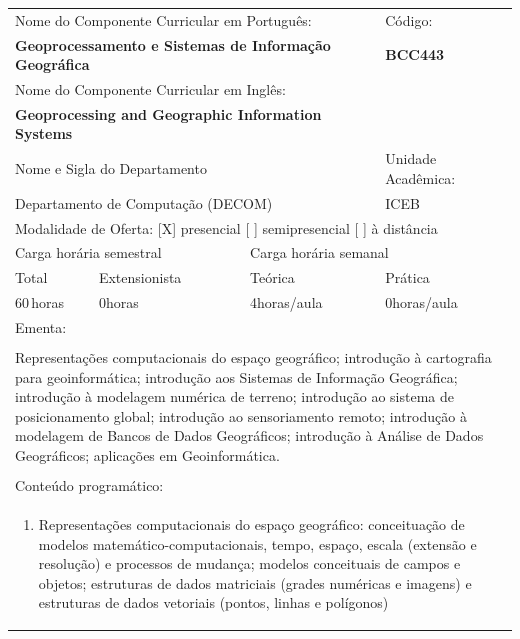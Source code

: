 \documentclass[11pt]{article}
\begin{document}
\begin{center}
\begin{longtable}{|p{4cm}|p{4cm}|p{4cm}|p{4cm}|}
\hline
\multicolumn{3}{|p{12cm}|}{Nome do Componente Curricular em Português:} &
\multicolumn{1}{p{4cm}|}{Código:} \\ 
\multicolumn{3}{|p{12cm}|}{\textbf{Geoprocessamento e Sistemas de Informação Geográfica}} &
\textbf{BCC443}\\ 
\multicolumn{3}{|p{12cm}|}{Nome do Componente Curricular em Inglês:} & \\ 
\multicolumn{3}{|p{12cm}|}{\textbf{Geoprocessing and Geographic Information Systems}} & \\ 
\hline
\multicolumn{3}{|p{12cm}|}{Nome e Sigla do Departamento} & Unidade Acadêmica: \\ 
\multicolumn{3}{|p{12cm}|}{Departamento de Computação (DECOM)} & {ICEB} \\ 
\hline
\multicolumn{4}{|p{16cm}|}{Modalidade de Oferta:
[X] presencial \hspace{0.6cm}
[ ] semipresencial \hspace{0.6cm}
[ ] à distância}\\
\hline
\multicolumn{2}{|p{8cm}|}{Carga horária semestral} &
\multicolumn{2}{p{8cm}|}{Carga horária semanal}\\
\hline
\multicolumn{1}{|p{4cm}|}{Total} &
\multicolumn{1}{p{4cm}|}{Extensionista} &
\multicolumn{1}{p{4cm}|}{Teórica} &
\multicolumn{1}{p{4cm}|}{Prática} \\ 
\multicolumn{1}{|p{4cm}|}{60\,horas} &
\multicolumn{1}{p{4cm}|}{0\;horas} &
\multicolumn{1}{p{4cm}|}{4\;horas/aula} &
\multicolumn{1}{p{4cm}|}{0\;horas/aula} \\ 
\hline
\multicolumn{4}{|p{16cm}|}{Ementa:}\\
\multicolumn{4}{|p{16cm}|}{}\\
\multicolumn{4}{|p{\dimexpr 16cm + 6\tabcolsep\relax}|}{Representações computacionais do espaço geográfico; introdução à cartografia para geoinformática; introdução aos Sistemas de Informação Geográfica; introdução à modelagem numérica de terreno; introdução ao sistema de posicionamento global; introdução ao sensoriamento remoto; introdução à modelagem de Bancos de Dados Geográficos; introdução à Análise de Dados Geográficos; aplicações em Geoinformática.}\\
\multicolumn{4}{|p{16cm}|}{}\\
\hline
\multicolumn{4}{|p{16cm}|}{Conteúdo programático:}\\*
\multicolumn{4}{|p{\dimexpr 16cm + 6\tabcolsep\relax}|}{\begin{enumerate}[start=1]\item Representações computacionais do espaço geográfico: conceituação de modelos matemático-computacionais, tempo, espaço, escala (extensão e resolução) e processos de mudança; modelos conceituais de campos e objetos; estruturas de dados matriciais (grades numéricas e imagens) e estruturas de dados vetoriais (pontos, linhas e polígonos)\end{enumerate}}\\

\end{longtable}
\end{center}
\end{document}
